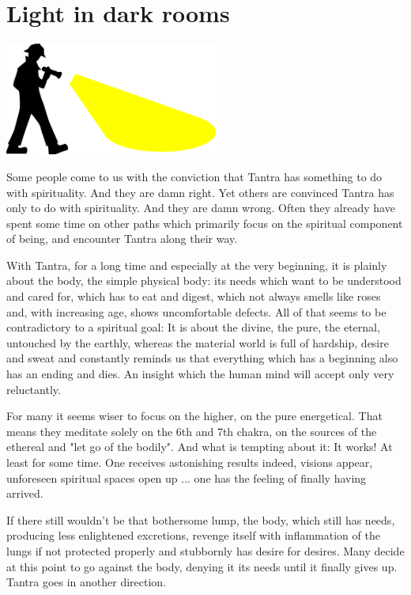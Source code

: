 \section{Light in dark rooms}

\begin{center}
\includegraphics[width=7cm]{images/05_light.png}
\end{center}

Some people come to us with the conviction that Tantra has something to do with spirituality. And they are damn right. Yet others are convinced Tantra has only to do with spirituality. And they are damn wrong. Often they already have spent some time on other paths which primarily focus on the spiritual component of being, and encounter Tantra along their way.

With Tantra, for a long time and especially at the very beginning, it is plainly about the body, the simple physical body: its needs which want to be understood and cared for, which has to eat and digest, which not always smells like roses and, with increasing age, shows uncomfortable defects. All of that seems to be contradictory to a spiritual goal: It is about the divine, the pure, the eternal, untouched by the earthly, whereas the material world is full of hardship, desire and sweat and constantly reminds us that everything which has a beginning also has an ending and dies. An insight which the human mind will accept only very reluctantly.

For many it seems wiser to focus on the higher, on the pure energetical. That means they meditate solely on the 6th and 7th chakra, on the sources of the ethereal and "let go of the bodily". And what is tempting about it: It works! At least for some time. One receives astonishing results indeed, visions appear, unforeseen spiritual spaces open up ... one has the feeling of finally having arrived.

If there still wouldn't be that bothersome lump, the body, which still has needs, producing less enlightened excretions, revenge itself with inflammation of the lungs if not protected properly and stubbornly has desire for desires. Many decide at this point to go against the body, denying it its needs until it finally gives up. Tantra goes in another direction.

